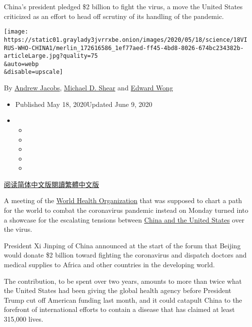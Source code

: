 China's president pledged \$2 billion to fight the virus, a move the
United States criticized as an effort to head off scrutiny of its
handling of the pandemic.

\texttt{[image: https://static01.graylady3jvrrxbe.onion/images/2020/05/18/science/18VIRUS-WHO-CHINA1/merlin\_172616586\_1ef77aed-ff45-4bd8-8026-674bc234382b-articleLarge.jpg?quality=75\\\&auto=webp\\\&disable=upscale]}

By \href{https://www.nytimes3xbfgragh.onion/by/andrew-jacobs}{Andrew
Jacobs},
\href{https://www.nytimes3xbfgragh.onion/by/michael-d-shear}{Michael D.
Shear} and
\href{https://www.nytimes3xbfgragh.onion/by/edward-wong}{Edward Wong}

\begin{itemize}
\item
  Published May 18, 2020Updated June 9, 2020
\item
  \begin{itemize}
  \item
  \item
  \item
  \item
  \item
  \end{itemize}
\end{itemize}

\href{https://cn.nytimes3xbfgragh.onion/world/20200519/coronavirus-who-china-trump/}{阅读简体中文版}\href{https://cn.nytimes3xbfgragh.onion/world/20200519/coronavirus-who-china-trump/zh-hant/}{閱讀繁體中文版}

A meeting of the
\href{https://www.nytimes3xbfgragh.onion/2020/06/09/health/coronavirus-asymptomatic-world-health-organization.html}{World
Health Organization} that was supposed to chart a path for the world to
combat the coronavirus pandemic instead on Monday turned into a showcase
for the escalating tensions between
\href{https://www.nytimes3xbfgragh.onion/2020/07/23/world/asia/us-china-consulate.html}{China
and the United States} over the virus.

President Xi Jinping of China announced at the start of the forum that
Beijing would donate \$2 billion toward fighting the coronavirus and
dispatch doctors and medical supplies to Africa and other countries in
the developing world.

The contribution, to be spent over two years, amounts to more than twice
what the United States had been giving the global health agency before
President Trump cut off American funding last month, and it could
catapult China to the forefront of international efforts to contain a
disease that has claimed at least 315,000 lives.

